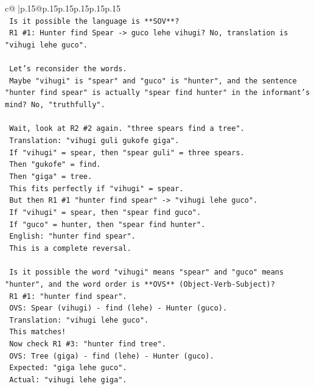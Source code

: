 \documentclass{article}
\begin{document}
{\begin{supertabular}{c@{$\;$}|p{.15\linewidth}@{}p{.15\linewidth}p{.15\linewidth}p{.15\linewidth}p{.15\linewidth}p{.15\linewidth}}
{{{\\ 
\texttt{   Is it possible the language is **SOV**?} \\
\texttt{   R1 \#1: Hunter find Spear {-}> guco lehe vihugi? No, translation is "vihugi lehe guco".} \\
\\ 
\texttt{   Let's reconsider the words.} \\
\texttt{   Maybe "vihugi" is "spear" and "guco" is "hunter", and the sentence "hunter find spear" is actually "spear find hunter" in the informant's mind? No, "truthfully".} \\
\\ 
\texttt{   Wait, look at R2 \#2 again. "three spears find a tree".} \\
\texttt{   Translation: "vihugi guli gukofe giga".} \\
\texttt{   If "vihugi" = spear, then "spear guli" = three spears.} \\
\texttt{   Then "gukofe" = find.} \\
\texttt{   Then "giga" = tree.} \\
\texttt{   This fits perfectly if "vihugi" = spear.} \\
\texttt{   But then R1 \#1 "hunter find spear" {-}> "vihugi lehe guco".} \\
\texttt{   If "vihugi" = spear, then "spear find guco".} \\
\texttt{   If "guco" = hunter, then "spear find hunter".} \\
\texttt{   English: "hunter find spear".} \\
\texttt{   This is a complete reversal.} \\
\\ 
\texttt{   Is it possible the word "vihugi" means "spear" and "guco" means "hunter", and the word order is **OVS** (Object{-}Verb{-}Subject)?} \\
\texttt{   R1 \#1: "hunter find spear".} \\
\texttt{   OVS: Spear (vihugi) {-} find (lehe) {-} Hunter (guco).} \\
\texttt{   Translation: "vihugi lehe guco".} \\
\texttt{   This matches!} \\
\texttt{   Now check R1 \#3: "hunter find tree".} \\
\texttt{   OVS: Tree (giga) {-} find (lehe) {-} Hunter (guco).} \\
\texttt{   Expected: "giga lehe guco".} \\
\texttt{   Actual: "vihugi lehe giga".} \\
}}}
\end{supertabular}}
\end{document}
